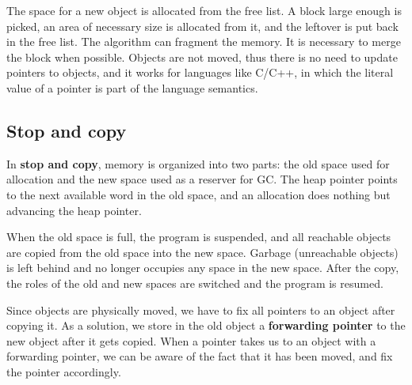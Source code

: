 The space for a new object is allocated from the free list. A block large enough is picked, an area of necessary size is allocated from it, and the leftover is put back in the free list. The algorithm can fragment the memory. It is necessary to merge the block when possible. Objects are not moved, thus there is no need to update pointers to objects, and it works for languages like C/C++, in which the literal value of a pointer is part of the language semantics.
\subsection{Stop and copy}
In \textbf{stop and copy}, memory is organized into two parts: the old space used for allocation and the new space used as a reserver for GC. The heap pointer points to the next available word in the old space, and an allocation does nothing but advancing the heap pointer.

When the old space is full, the program is suspended, and all reachable objects are copied from the old space into the new space. Garbage (unreachable objects) is left behind and no longer occupies any space in the new space. After the copy, the roles of the old and new spaces are switched and the program is resumed. 

Since objects are physically moved, we have to fix all pointers to an object after copying it. As a solution, we store in the old object a \textbf{forwarding pointer} to the new object after it gets copied. When a pointer takes us to an object with a forwarding pointer, we can be aware of the fact that it has been moved, and fix the pointer accordingly. 


